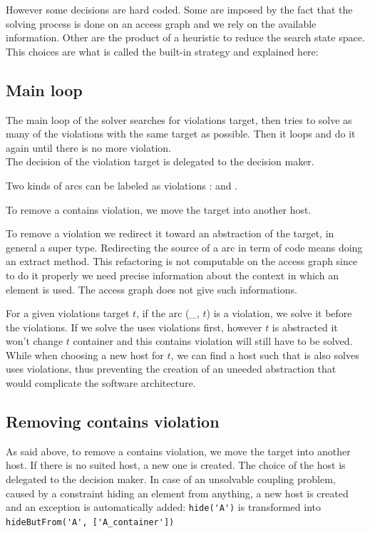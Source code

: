 \documentclass[]{article}
\begin{document}
However some decisions are hard coded. Some are imposed by the fact that the solving process is done on an access graph and we rely on the available information.
Other are the product of a heuristic to reduce the search state space. This choices are what is called the built-in strategy and explained here:

\subsection{Main loop}
The main loop of the solver searches for violations target, then tries to solve as many of the violations with the same target as possible. Then it loops and do it again until there is no more violation.\\

The decision of the violation target is delegated to the decision maker.

Two kinds of arcs can be labeled as violations : \textuses{} and \textcontains.

To remove a contains violation, we move the target into another host.

To remove a \textuses{} violation we redirect it toward an abstraction of the target, in general a super type. Redirecting the source of a \textuses{} arc in term of code means doing an extract method. This refactoring is not computable on the access graph since to do it properly we need precise information about the context in which an element is used. The access graph does not give such informations.

For a given violations target $t$, if the \textcontains{} arc (\_, $t$) is a violation, we solve it before the \textuses{} violations.
If we solve the uses violations first, however $t$ is abstracted it won't change $t$ container and this contains violation will still have to be solved.
While when choosing a new host for $t$, we can find a host such that is also solves uses violations, thus preventing the creation of an uneeded abstraction that would complicate the software architecture.

\subsection{Removing contains violation}
As said above, to remove a contains violation, we move the target into another host. If there is no suited host, a new one is created.
The choice of the host is delegated to the decision maker.
In case of an unsolvable coupling problem, caused by a constraint hiding an element from anything, a new host is created and an exception is automatically added:
\verb|hide('A')| is transformed into \verb|hideButFrom('A', ['A_container'])|
\end{document}
